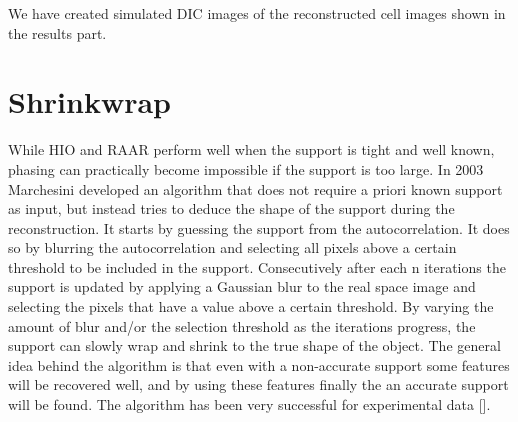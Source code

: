 
We have created simulated DIC images of the reconstructed cell images shown in the results part.

\section{Shrinkwrap}
While HIO and RAAR perform well when the support is tight and well known, phasing can practically become impossible if the support is too large. In 2003 Marchesini developed an algorithm that does not require a priori known support as input, but instead tries to deduce the shape of the support during the reconstruction. It starts by guessing the support from the autocorrelation. It does so by blurring the autocorrelation and selecting all pixels above a certain threshold to be included in the support. Consecutively after each n iterations the support is updated by applying a Gaussian blur to the real space image and selecting the pixels that have a value above a certain threshold. By varying the amount of blur and/or the selection threshold as the iterations progress, the support can slowly wrap and shrink to the true shape of the object. The general idea behind the algorithm is that even with a non-accurate support some features will be recovered well, and by using these features finally the an accurate support will be found. The algorithm has been very successful for experimental data [].

